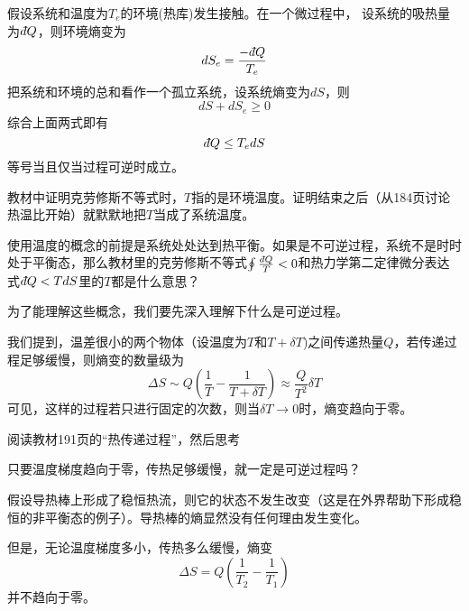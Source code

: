 \documentclass[CJK]{beamer}
\begin{document}
\begin{frame}
\bch
假设系统和温度为$T_e$的环境(热库)发生接触。在一个微过程中，
设系统的吸热量为$\dbar Q$，则环境熵变为
$$ dS_e = \frac{-\dbar Q}{T_e} $$
把系统和环境的总和看作一个孤立系统，设系统熵变为$dS$，则
$$dS +dS_e \ge 0$$
综合上面两式即有
{\blue $$\dbar Q \le T_e dS $$
等号当且仅当过程可逆时成立}。
\ech
\end{frame}


\begin{frame}
\bch

教材中证明克劳修斯不等式时，$T$指的是环境温度。证明结束之后（从184页讨论热温比开始）就默默地把$T$当成了系统温度。

\ech
\end{frame}


\begin{frame}
\bch
使用温度的概念的前提是系统处处达到热平衡。如果是不可逆过程，系统不是时时处于平衡态，那么教材里的克劳修斯不等式$\oint \frac{\dbar Q}{T} < 0$和热力学第二定律微分表达式$\dbar Q < TdS$里的$T$都是什么意思？

\skiplines

为了能理解这些概念，我们要先深入理解下什么是可逆过程。
\ech
\end{frame}


\begin{frame}
\bch

我们提到，温差很小的两个物体（设温度为$T$和$T+\delta T$)之间传递热量$Q$，若传递过程足够缓慢，则熵变的数量级为
  $$\Delta S \sim Q\left(\frac{1}{T}-\frac{1}{T+\delta T}\right) \approx \frac{Q}{T^2}\delta T $$
  可见，这样的过程若只进行固定的次数，则当$\delta T\rightarrow 0$时，熵变趋向于零。

\ech
\end{frame}

\begin{frame}
\bch
阅读教材191页的“热传递过程”，然后思考


只要温度梯度趋向于零，传热足够缓慢，就一定是可逆过程吗？

\ech
\end{frame}

\begin{frame}
\bch


假设导热棒上形成了稳恒热流，则它的状态不发生改变（这是在外界帮助下形成稳恒的非平衡态的例子）。导热棒的熵显然没有任何理由发生变化。

\skipline

但是，无论温度梯度多小，传热多么缓慢，熵变
$$ \Delta S = Q\left(\frac{1}{T_2} - \frac{1}{T_1}\right) $$
并不趋向于零。

\ech
\end{frame}
\end{document}
